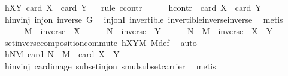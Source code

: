 \begin{isabellebody}
\ hXY{\isacharcolon}{\kern0pt}\ {\isachardoublequoteopen}card\ X\ {\isasymle}\ card\ Y{\isachardoublequoteclose}\isanewline
\ \ \isamarkupfalse%
{\isacharparenleft}{\kern0pt}rule\ ccontr{\isacharparenright}{\kern0pt}\isanewline
\ \ \ \ \isamarkupfalse%
\ hcontr{\isacharcolon}{\kern0pt}\ {\isachardoublequoteopen}{\isasymnot}\ card\ X\ {\isasymle}\ card\ Y{\isachardoublequoteclose}\isanewline
\ \ \ \ \isamarkupfalse%
\ hinvinj{\isacharcolon}{\kern0pt}\ {\isachardoublequoteopen}inj{\isacharunderscore}{\kern0pt}on\ inverse\ G{\isachardoublequoteclose}\ \isamarkupfalse%
\ inj{\isacharunderscore}{\kern0pt}onI\ invertible\ invertible{\isacharunderscore}{\kern0pt}inverse{\isacharunderscore}{\kern0pt}inverse\ \isamarkupfalse%
\ metis\isanewline
\ \ \ \ \isamarkupfalse%
\ {\isacharquery}{\kern0pt}M\ {\isacharequal}{\kern0pt}\ {\isachardoublequoteopen}inverse\ {\isacharbackquote}{\kern0pt}\ X{\isachardoublequoteclose}\isanewline
\ \ \ \ \isamarkupfalse%
\ {\isacharquery}{\kern0pt}N\ {\isacharequal}{\kern0pt}\ {\isachardoublequoteopen}inverse\ {\isacharbackquote}{\kern0pt}\ Y{\isachardoublequoteclose}\isanewline
\ \ \ \ \isamarkupfalse%
\ {\isachardoublequoteopen}{\isacharquery}{\kern0pt}N\ {\isasymcdots}\ {\isacharquery}{\kern0pt}M\ {\isacharequal}{\kern0pt}\ inverse\ {\isacharbackquote}{\kern0pt}\ {\isacharparenleft}{\kern0pt}X\ {\isasymcdots}\ Y{\isacharparenright}{\kern0pt}{\isachardoublequoteclose}\ \isamarkupfalse%
\ set{\isacharunderscore}{\kern0pt}inverse{\isacharunderscore}{\kern0pt}composition{\isacharunderscore}{\kern0pt}commute\ hXYM\ M{\isacharunderscore}{\kern0pt}def\ \isamarkupfalse%
\ auto\isanewline
\ \ \ \ \isamarkupfalse%
\ \isamarkupfalse%
\ hNM{\isacharcolon}{\kern0pt}\ {\isachardoublequoteopen}card\ {\isacharparenleft}{\kern0pt}{\isacharquery}{\kern0pt}N\ {\isasymcdots}\ {\isacharquery}{\kern0pt}M{\isacharparenright}{\kern0pt}\ {\isacharequal}{\kern0pt}\ card\ {\isacharparenleft}{\kern0pt}X\ {\isasymcdots}\ Y{\isacharparenright}{\kern0pt}{\isachardoublequoteclose}\ \isanewline
\ \ \ \ \ \ \isamarkupfalse%
\ hinvinj\ card{\isacharunderscore}{\kern0pt}image\ subset{\isacharunderscore}{\kern0pt}inj{\isacharunderscore}{\kern0pt}on\ smul{\isacharunderscore}{\kern0pt}subset{\isacharunderscore}{\kern0pt}carrier\ \isamarkupfalse%
\ metis\isanewline
\ \ \ \ \isamarkupfalse%
\ \isamarkupfalse%

\end{isabellebody}
